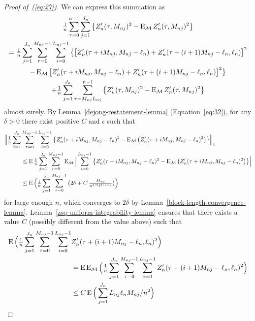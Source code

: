 \documentclass[11pt]{article}
\begin{document}
\begin{proof}[Proof of~(\ref{eq:27})]
  We can express this summation as
  \begin{multline}\label{eq:29}
    \tfrac{1}{n} \sum_{\tau=0}^{n-1}  \sum_{j=1}^{J_n}
    \big\{Z_n'(\tau, M_{nj})^2 - \operatorname{E}_{\mathcal{M}} Z_n'(\tau, M_{nj})^2 \big\}
    \\ =
    \tfrac{1}{n} \sum_{j=1}^{J_n} \sum_{\tau=0}^{M_{nj}-1}
    \sum_{i=0}^{L_{nj}-1}\big\{\big[ Z_n'(\tau + i M_{nj}, M_{nj} - \ell_n) + Z_n'(\tau + (i+1) M_{nj} - \ell_n, \ell_n)\big]^2 \\
    - \operatorname{E}_{\mathcal{M}}\big[ Z_n'(\tau + i M_{nj}, M_{nj} - \ell_n) + Z_n'(\tau + (i+1) M_{nj} - \ell_n, \ell_n)\big]^2 \big\} \\
    + \tfrac{1}{n} \sum_{j=1}^{J_n} \sum_{\tau= M_{nj}L_{nj}}^{n-1}
    \big\{Z_{n}'(\tau, M_{nj})^2 - \operatorname{E}_{\mathcal{M}} Z_n'(\tau, M_{nj})^2 \big\}
  \end{multline}
  almost surely.
  By Lemma~\ref{dejong-restatement-lemma} (Equation~\ref{eq:32}), for
  any $\delta > 0$ there exist positive $C$ and $\epsilon$ such that
  \begin{align*}
    \Big\lVert\tfrac{1}{n} \sum_{j=1}^{J_n} & \sum_{\tau=0}^{M_{nj}-1}
    \sum_{i=0}^{L_{nj}-1} \big\{ Z_n'(\tau + i M_{nj}, M_{nj} - \ell_n)^2 -
    \operatorname{E}_{\mathcal{M}} \big(Z_n'(\tau + i M_{nj}, M_{nj} - \ell_n)^2\big) \big\}\Big\rVert_1 \\
    &\leq \operatorname{E} \tfrac{1}{n} \sum_{j=1}^{J_n} \sum_{\tau=0}^{M_{nj}-1}
    \operatorname{E}_{\mathcal{M}} \Big| \sum_{i=0}^{L_{nj}-1} \big\{ Z_n'(\tau + i M_{nj}, M_{nj} - \ell_n)^2 -
    \operatorname{E}_{\mathcal{M}} \big(Z_n'(\tau + i M_{nj}, M_{nj} - \ell_n)^2\big) \big\} \Big|\\
    &\leq \operatorname{E} \Big(\tfrac{1}{n} \sum_{j=1}^{J_n} \sum_{\tau=0}^{M_{nj}-1}
    \big(2 \delta + C \, \tfrac{M_{nj}}{n^{1/2} \ell^{1/2+\epsilon}}\big)\Big)
  \end{align*}
  for large enough $n$, which converges to $2 \delta$ by
  Lemma~\ref{block-length-convergence-lemma}.
  Lemma~\ref{zsq-uniform-integrability-lemma} ensures that there
  exists a value $C$ (possibly different from the value above) such
  that
  \begin{align*}
    \E\Big(\tfrac{1}{n}  \sum_{j=1}^{J_n} \sum_{\tau=0}^{M_{nj}-1} \sum_{i=0}^{L_{nj}-1}
    & Z_n'(\tau + (i+1) M_{nj} - \ell_n, \ell_n)^2 \Big) \\
    &= \E \Em \Big(\tfrac{1}{n}  \sum_{j=1}^{J_n} \sum_{\tau=0}^{M_{nj}-1} \sum_{i=0}^{L_{nj}-1}
    Z_n'(\tau + (i+1) M_{nj} - \ell_n, \ell_n)^2 \Big) \\
    &\leq C \E \Big(\sum_{j=1}^{J_n} L_{nj} \ell_n M_{nj} / n^2\Big)

\end{align*}
\end{proof}
\end{document}
